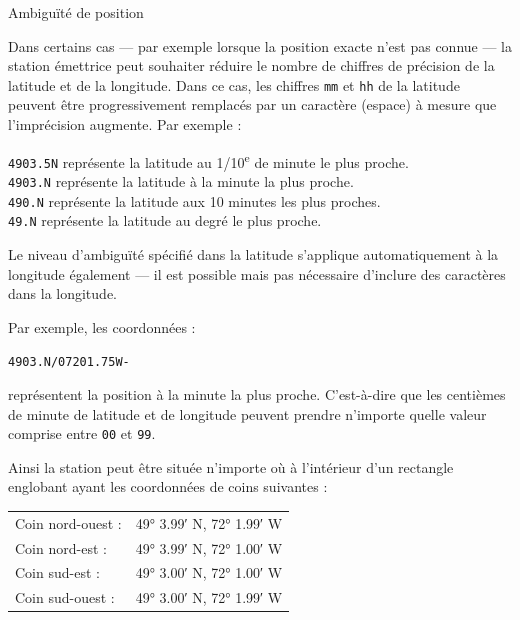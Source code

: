\begin{aprssideblock}{Ambiguïté de position}
\label{ambiguuxeftuxe9-de-position}
Dans certains cas --- par exemple lorsque la position exacte n'est pas
connue --- la station émettrice peut souhaiter réduire le nombre de
chiffres de précision de la latitude et de la longitude. Dans ce cas,
les chiffres \texttt{mm} et \texttt{hh} de la latitude peuvent être
progressivement remplacés par un caractère \lit{~} (espace) à mesure que
l'imprécision augmente. Par exemple :

\begin{aprsexample}
\texttt{4903.5}\lit{~}\texttt{N} \exgap représente la latitude au
1/10\textsuperscript{e} de minute le plus proche. \\
\texttt{4903.}\lit{~~}\texttt{N} \exgap représente la latitude à la
minute la plus proche. \\
\texttt{490}\lit{~}\texttt{.}\lit{~~}\texttt{N} \exgap représente la
latitude aux 10 minutes les plus proches. \\
\texttt{49}\lit{~~}\texttt{.}\lit{~~}\texttt{N} \exgap représente la
latitude au degré le plus proche.
\end{aprsexample}

Le niveau d'ambiguïté spécifié dans la latitude s'applique
automatiquement à la longitude également --- il est possible mais pas nécessaire
d'inclure des caractères \lit{~} dans la longitude.

Par exemple, les coordonnées :

\begin{aprsexample}
\texttt{4903.}\lit{~~}\texttt{N/07201.75W-}
\end{aprsexample}

représentent la position à la minute la plus proche. C'est-à-dire que
les centièmes de minute de latitude et de longitude peuvent prendre
n'importe quelle valeur comprise entre \texttt{00} et \texttt{99}.

Ainsi la station peut être située n'importe où à l'intérieur d'un
rectangle englobant ayant les coordonnées de coins suivantes :

\begin{aprsexample}
\begin{tabular}{@{}l@{\hspace{1em}}l@{}}
Coin nord-ouest : & 49° 3.99′ N, 72° 1.99′ W \\
Coin nord-est : & 49° 3.99′ N, 72° 1.00′ W \\
Coin sud-est : & 49° 3.00′ N, 72° 1.00′ W \\
Coin sud-ouest : & 49° 3.00′ N, 72° 1.99′ W \\
\end{tabular}
\end{aprsexample}
\end{aprssideblock}

